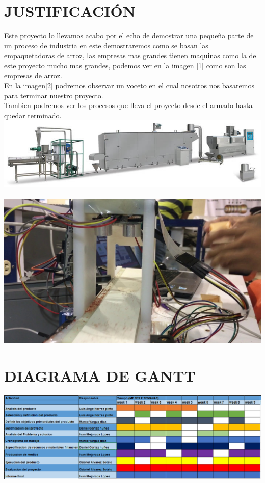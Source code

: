 \documentclass[11pt,a4paper]{article}
\begin{document}
\section{JUSTIFICACI\'ON}
Este proyecto lo llevamos acabo por el echo de demostrar una peque\~na parte de un proceso de industria en este demostraremos como se basan las empaquetadoras de arroz, las empresas mas grandes tienen maquinas como la de este proyecto mucho mas grandes, podemos ver en la imagen [1] como son las empresas de arroz.\\En la imagen[2] podremos observar un voceto en el cual nosotros nos basaremos para terminar nuestro proyecto.\\Tambien podremos ver los procesos que lleva el proyecto desde el armado hasta quedar terminado. 
\includegraphics[width=\textwidth]{12-1-1b.jpg}
\\
\\ 
\includegraphics[width=\textwidth]{imagen2.jpg} 
\newpage
\section{DIAGRAMA DE GANTT}
\includegraphics[width=\textwidth]{diagrama de gant.png} 
\end{document}

